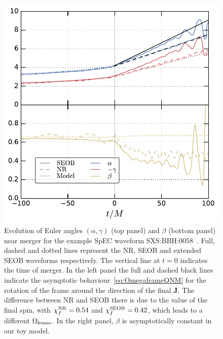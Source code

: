 \documentclass[aps,showpacs,twocolumn,
prd,superscriptaddress,nofootinbib]{revtex4-1}
\begin{document}
\begin{figure}
  \centering
  \includegraphics[width=.98\linewidth]{plots/eulerSXS0058_py.pdf}
  \caption{Evolution of Euler angles $(\alpha, \gamma)$ (top panel) and $\beta$ (bottom panel) near merger for the example SpEC waveform SXS:BBH:0058~\cite{SpEC, SXScatalog, Mroue+12, Mroue+13}. Full, dashed and dotted lines represent the NR, SEOB and extended SEOB waveforms respectively. The vertical line at $t=0$ indicates the time of merger. In the left panel the full and dashed black lines indicate the asymptotic behaviour~\eqref{eq:OmegaframeQNM} for the rotation of the frame around the direction of the final $\bm{J}$. The difference between NR and SEOB there is due to the value of the final spin, with $\chi_{f}^{\rm NR} = 0.54$ and $\chi_{f}^{\rm SEOB} = 0.42$, which leads to a different $\Omega_{\rm frame}$. In the right panel, $\beta$ is asymptotically constant in our toy model.}
  \label{fig:precmodel}
\end{figure}

\end{document}
